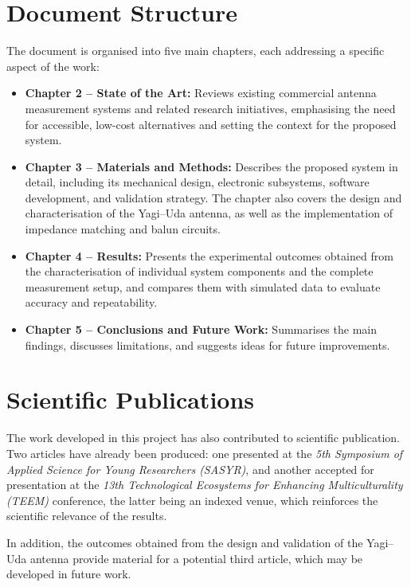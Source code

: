 \section{Document Structure}

The document is organised into five main chapters, each addressing a specific aspect of the work:

\begin{itemize}
    \item \textbf{Chapter 2 – State of the Art:} Reviews existing commercial antenna measurement systems and related research initiatives, emphasising the need for accessible, low-cost alternatives and setting the context for the proposed system.
    \item \textbf{Chapter 3 – Materials and Methods:} Describes the proposed system in detail, including its mechanical design, electronic subsystems, software development, and validation strategy. The chapter also covers the design and characterisation of the Yagi–Uda antenna, as well as the implementation of impedance matching and balun circuits.
    \item \textbf{Chapter 4 – Results:} Presents the experimental outcomes obtained from the characterisation of individual system components and the complete measurement setup, and compares them with simulated data to evaluate accuracy and repeatability.
    \item \textbf{Chapter 5 – Conclusions and Future Work:} Summarises the main findings, discusses limitations, and suggests ideas for future improvements.
\end{itemize}



\section{Scientific Publications}

The work developed in this project has also contributed to scientific publication. Two articles have already been produced: one presented at the \textit{5th Symposium of Applied Science for Young Researchers (SASYR)}, and another accepted for presentation at the \textit{13th Technological Ecosystems for Enhancing Multiculturality (TEEM)} conference, the latter being an indexed venue, which reinforces the scientific relevance of the results. 

In addition, the outcomes obtained from the design and validation of the Yagi–Uda antenna provide material for a potential third article, which may be developed in future work.
 
